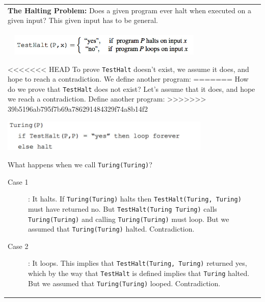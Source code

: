 {\tabulinesep=1mm
\begin{tabu}{|p{16cm} |}
\hline
\textbf{The Halting Problem:} Does a given program ever halt when executed 
on a given input? This given input has to be general. \\
\begin{center}
\includegraphics[width=10cm, height=1cm]{intro_testhalt.jpg}
\end{center}

<<<<<<< HEAD
To prove \texttt{TestHalt} doesn't exist, we assume it does, 
and hope to reach a contradiction. We define another program:
=======
How do we prove that \texttt{TestHalt} does not exist? Let's assume that it does, 
and hope we reach a contradiction. \newline
Define another program:
>>>>>>> 39b5196ab795f7b69a786291484329f74a8b14f2
\begin{center}
\includegraphics[width=10cm, height=1.5cm]{intro_turing.jpg}
\end{center}
What happens when we call \texttt{Turing(Turing)}?
\begin{description}
\item[Case 1]: It halts. If \texttt{Turing(Turing)} halts then \texttt{TestHalt(Turing, Turing)} 
must have returned no. But \texttt{TestHalt(Turing Turing)} calls 
\texttt{Turing(Turing)} and calling \texttt{Turing(Turing)} must loop. 
But we assumed that \texttt{Turing(Turing)} halted. Contradiction.
\item[Case 2]: It loops. This implies that \texttt{TestHalt(Turing, Turing)} returned yes, which by the 
way that \texttt{TestHalt} is defined implies that \texttt{Turing} halted. 
But we assumed  that \texttt{Turing(Turing)} looped. Contradiction.
\end{description}
\\
\hline
\end{tabu}
}


